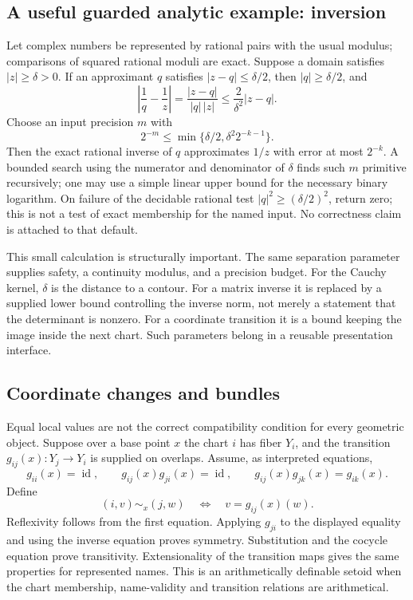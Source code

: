 \subsection{A useful guarded analytic example: inversion}

Let complex numbers be represented by rational pairs with the usual modulus;
comparisons of squared rational moduli are exact. Suppose a domain satisfies
$|z|\ge\delta>0$. If an approximant $q$ satisfies
$|z-q|\le\delta/2$, then $|q|\ge\delta/2$, and
\[
 \left|\frac1q-\frac1z\right|
   =\frac{|z-q|}{|q|\,|z|}
   \le \frac{2}{\delta^2}|z-q|.
\]
Choose an input precision $m$ with
\[
 2^{-m}\le\min\{\delta/2,\delta^2 2^{-k-1}\}.
\]
Then the exact rational inverse of $q$ approximates $1/z$ with error at most
$2^{-k}$. A bounded search using the numerator and denominator of $\delta$
finds such $m$ primitive recursively; one may use a simple linear upper
bound for the necessary binary logarithm. On failure of the decidable rational test $|q|^2\ge(\delta/2)^2$, return
zero; this is not a test of exact membership for the named input. No correctness claim is attached to that default.

This small calculation is structurally important. The same separation
parameter supplies safety, a continuity modulus, and a precision budget.
For the Cauchy kernel, $\delta$ is the distance to a contour. For a matrix
inverse it is replaced by a supplied lower bound controlling the inverse
norm, not merely a statement that the determinant is nonzero. For a
coordinate transition it is a bound keeping the image inside the next
chart. Such parameters belong in a reusable presentation interface.

\subsection{Coordinate changes and bundles}

Equal local values are not the correct compatibility condition for every
geometric object. Suppose over a base point $x$ the chart $i$ has fiber
$Y_i$, and the transition $g_{ij}(x):Y_j\to Y_i$ is supplied on overlaps.
Assume, as interpreted equations,
\[
 g_{ii}(x)=\operatorname{id},\qquad
 g_{ij}(x)g_{ji}(x)=\operatorname{id},\qquad
 g_{ij}(x)g_{jk}(x)=g_{ik}(x).
\]
Define
\[
        (i,v)\sim_x(j,w)\quad\Longleftrightarrow\quad
                          v=g_{ij}(x)(w).
\]
Reflexivity follows from the first equation. Applying $g_{ji}$ to the
displayed equality and using the inverse equation proves symmetry.
Substitution and the cocycle equation prove transitivity. Extensionality
of the transition maps gives the same properties for represented names.
This is an arithmetically definable setoid when the chart membership,
name-validity and transition relations are arithmetical.

